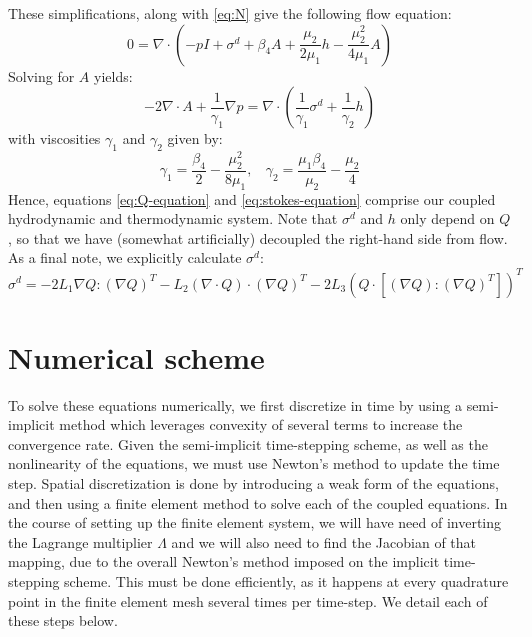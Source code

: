 \documentclass[reqno]{article}
\begin{document}
  These simplifications, along with \eqref{eq:N} give the following flow equation:
  \begin{equation}
    0
    =
    \nabla \cdot \left(
      -p I
      + \sigma^d
      + \beta_4 A
      + \frac{\mu_2}{2 \mu_1} h - \frac{\mu_2^2}{4 \mu_1} A
    \right)
  \end{equation}
  Solving for $A$ yields:
  \begin{equation} \label{eq:stokes-equation}
    -2 \nabla \cdot A + \frac{1}{\gamma_1} \nabla p
    =
    \nabla \cdot \left(
      \frac{1}{\gamma_1} \sigma^d
      + \frac{1}{\gamma_2} h
    \right)
  \end{equation}
  with viscosities $\gamma_1$ and $\gamma_2$ given by:
  \begin{equation}
    \gamma_1
    =
    \frac{\beta_4}{2} - \frac{\mu_2^2}{8 \mu_1},
    \:\:\:\:
    \gamma_2
    =
    \frac{\mu_1 \beta_4}{\mu_2} - \frac{\mu_2}{4}
  \end{equation}
  Hence, equations \eqref{eq:Q-equation} and \eqref{eq:stokes-equation} comprise
  our coupled hydrodynamic and thermodynamic system.
  Note that $\sigma^d$ and $h$ only depend on $Q$, so that we have (somewhat
  artificially) decoupled the right-hand side from flow.
  As a final note, we explicitly calculate $\sigma^d$:
  \begin{equation}
    \sigma^d
    =
    - 2 L_1 \nabla Q : \left( \nabla Q \right)^T
    - L_2 \left( \nabla \cdot Q \right) \cdot \left( \nabla Q \right)^T
    - 2 L_3 \left( Q \cdot \left[ \left( \nabla Q \right) : \left( \nabla Q \right)^T \right] \right)^T
  \end{equation}
  
  \section{Numerical scheme} \label{numerical-scheme}
  To solve these equations numerically, we first discretize in time by using a
  semi-implicit method which leverages convexity of several terms to increase
  the convergence rate.
  Given the semi-implicit time-stepping scheme, as well as the nonlinearity of
  the equations, we must use Newton's method to update the time step.
  Spatial discretization is done by introducing a weak form of the equations,
  and then using a finite element method to solve each of the coupled equations.
  In the course of setting up the finite element system, we will have need of
  inverting the Lagrange multiplier $\Lambda$ and we will also need to find the
  Jacobian of that mapping, due to the overall Newton's method imposed on the
  implicit time-stepping scheme.
  This must be done efficiently, as it happens at every quadrature point in the
  finite element mesh several times per time-step.
  We detail each of these steps below.
\end{document}
